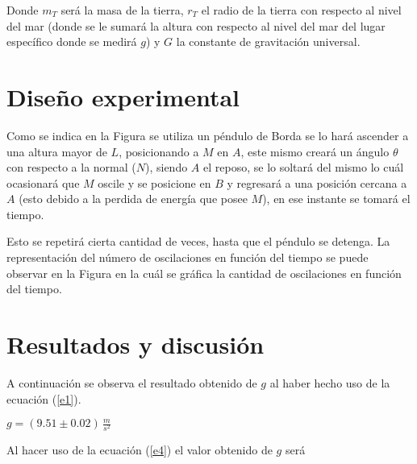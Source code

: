 \documentclass[a4paper,twocolumn]{article}
\begin{document}
Donde $m_{T}$ será la masa de la tierra\cite{b10}, $r_{T}$\cite{b10} el radio de la tierra con respecto al nivel del mar (donde se le sumará la altura con respecto al nivel del mar del lugar específico donde se medirá $g$) y $G$ la constante de gravitación universal\cite{b1}.

\section{Diseño experimental}

Como se indica en la Figura se utiliza un péndulo de Borda\cite{b1} se lo hará ascender a una altura mayor de $L$, posicionando a $M$ en $A$, este mismo creará un ángulo $\theta$ con respecto a la normal ($N$), siendo $A$ el reposo, se lo soltará del mismo lo cuál ocasionará que $M$ oscile y se posicione en $B$ y regresará a una posición cercana a $A$ (esto debido a la perdida de energía que posee $M$), en ese instante se tomará el tiempo.

Esto se repetirá cierta cantidad de veces, hasta que el péndulo se detenga. La representación del número de oscilaciones en función del tiempo se puede observar en la Figura en la cuál se gráfica la cantidad de oscilaciones en función del tiempo.



\section{Resultados y discusión}

A continuación se observa el resultado obtenido de $g$ al haber hecho uso de la ecuación (\ref{e1}).

\begin{center}
    \begin{large}
        $g=(9.51 \pm 0.02)\,\frac{m}{s^{2}}$
    \end{large}
\end{center}

Al hacer uso de la ecuación (\ref{e4}) el valor obtenido de $g$ será
\end{document}
